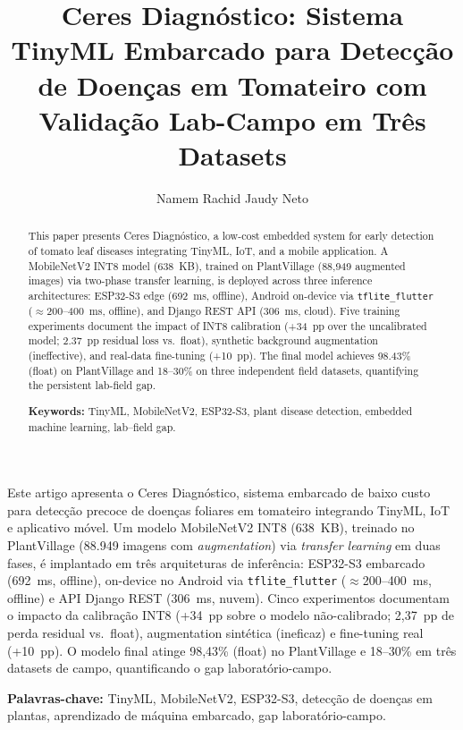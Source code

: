 \documentclass[12pt]{article}
\title{Ceres Diagnóstico: Sistema TinyML Embarcado para Detecção de
Doenças em Tomateiro com Validação Lab-Campo em Três Datasets}
\author{Namem Rachid Jaudy Neto\inst{1}}
\begin{document}
\maketitle

\begin{abstract}
This paper presents Ceres Diagnóstico, a low-cost embedded system for early
detection of tomato leaf diseases integrating TinyML, IoT, and a mobile application.
A MobileNetV2 INT8 model (638~KB), trained on PlantVillage (88{,}949 augmented
images) via two-phase transfer learning, is deployed across three inference
architectures:
ESP32-S3 edge (692~ms, offline), Android on-device via \texttt{tflite\_flutter}
($\approx$200--400~ms, offline), and Django REST API (306~ms, cloud). Five training
experiments document the impact of INT8 calibration (+34~pp over the uncalibrated
model; 2.37~pp residual loss vs.\ float), synthetic background augmentation
(ineffective), and real-data fine-tuning (+10~pp). The final model achieves 98.43\%
(float) on PlantVillage and 18--30\% on three independent field datasets,
quantifying the persistent lab-field gap.

\vspace{0.5em}\noindent\textbf{Keywords:} TinyML, MobileNetV2, ESP32-S3, plant
disease detection, embedded machine learning, lab--field gap.
\end{abstract}

\begin{resumo}
Este artigo apresenta o Ceres Diagnóstico, sistema embarcado de baixo custo para
detecção precoce de doenças foliares em tomateiro integrando TinyML, IoT e
aplicativo móvel. Um modelo MobileNetV2 INT8 (638~KB), treinado no PlantVillage
(88.949 imagens com \textit{augmentation}) via \textit{transfer learning} em duas
fases, é implantado em três arquiteturas de inferência: ESP32-S3 embarcado
(692~ms, offline), on-device no
Android via \texttt{tflite\_flutter} ($\approx$200--400~ms, offline) e API Django
REST (306~ms, nuvem). Cinco experimentos documentam o impacto da calibração INT8
(+34~pp sobre o modelo não-calibrado; 2,37~pp de perda residual vs.\ float),
augmentation sintética (ineficaz) e fine-tuning real (+10~pp). O modelo final atinge
98,43\% (float) no PlantVillage e 18--30\% em três datasets de campo,
quantificando o gap laboratório-campo.

\vspace{0.5em}\noindent\textbf{Palavras-chave:} TinyML, MobileNetV2, ESP32-S3,
detecção de doenças em plantas, aprendizado de máquina embarcado, gap
laboratório-campo.
\end{resumo}
\end{document}
